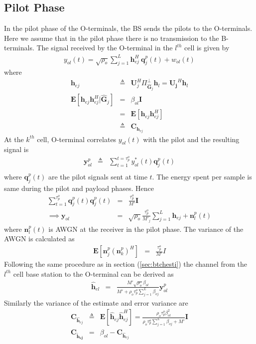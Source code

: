 \documentclass[10pt, a4paper, twoside,fleqn]{article}
\begin{document}
\subsection{Pilot Phase}
	In the pilot phase of the O-terminals, the BS sends the pilots to the O-terminals. Here we assume that in the pilot phase there is no transmission to the B-terminals.
The signal received by the O-terminal in the $l^{th}$ cell is given by
\begin{eqnarray}
	y_{ol}(t)=\sqrt{\rho_o} \sum_{j=1}^{L} \pmb{h}^H_{ej} \ \pmb{q}^p_{j}(t) + w_{ol}(t) 
\end{eqnarray}
where
\begin{eqnarray}
	\pmb{h}_{ej} &\triangleq& \pmb{U}_j^H\Pi^{\perp}_{{\widehat{\pmb{G}}_j}}\pmb{h}_l = \pmb{U_j}^H\pmb{h}_l \nonumber \\
    \pmb{E}[\pmb{h}_{ej}\pmb{h}^H_{ej}|\pmb{\hat G}_j] &=& \beta_{ol}\pmb{I} \nonumber \\
			                     &=& \pmb{E}[\pmb{h}_{ej}\pmb{h}^H_{ej}] \nonumber \\
                                           &\triangleq& \pmb{C}_{\pmb{h}_{ej}} \nonumber
\end{eqnarray}
At the $k^{th}$ cell, O-terminal correlates $y_{ol}(t)$ with the pilot and the resulting signal is
\begin{eqnarray}
	\pmb{y}_{ol}^{p} &\triangleq& \sum_{t=1}^{t=\tau_p^o} y_{ol}^*(t)\pmb{q}^{p}_{j}(t) \nonumber \\
\end{eqnarray}
where $\pmb{q}_j^p(t)$ are the pilot signals sent at time $t$. The energy spent per sample is same during the pilot and payload phases. Hence 
\begin{eqnarray}
    \sum\limits_{t=1}^{\tau_p^o}\pmb{q}^p_{j}(t)\pmb{q}^p_{j}(t)&=&\frac{\tau_p^o}{M'}\pmb{I} \\
\implies \pmb{y}_{ol} &=& \sqrt{\rho_o}\frac{\tau_p^o}{M'_j}\sum_{j=1}^{L}\pmb{h}_{ej}+\pmb{n}^p_{l}(t)
\end{eqnarray}
where $\pmb{n}^p_{l}(t)$ is AWGN at the receiver in the pilot phase. The variance of the AWGN is calculated as
\begin{eqnarray}
	\pmb{E}[\pmb{n}^p_{j}(\pmb{n}^p_{k})^H] &=& \frac{\tau_p^o}{M'}I \nonumber
\end{eqnarray}
Following the same procedure as in section (\ref{sec:btchesti}) the channel from the $l^{th}$ cell base station to the O-terminal can be derived as 
\begin{eqnarray}\label{eqn:otchesti}
	\pmb{\hat h}_{el} &=& \frac{M'\sqrt{\rho_o}\beta_{ol}}{M'+\rho_o\tau_p^o\sum\limits_{j=1}^{L}\beta_{oj}}\pmb{y}^p_{ol}
\end{eqnarray}
Similarly the variance of the estimate and error variance are
\begin{eqnarray}
	\pmb{C}_{\pmb{\hat h}_{ej}} &\triangleq& \pmb{E}[\pmb{\hat h}_{ej}\pmb{\hat h}^H_{ej}] = \frac{\rho_o\tau_p^o\beta^2_{ol}}{\rho_o\tau_p^o\sum\limits_{j=1}^{L}\beta_{oj}+M'}\pmb{I} \\
	\pmb{C_{\widetilde{h}_{ej}}} &=& \beta_{ol} - 	\pmb{C}_{\pmb{\hat h}_{ej}}
\end{eqnarray}
\end{document}
